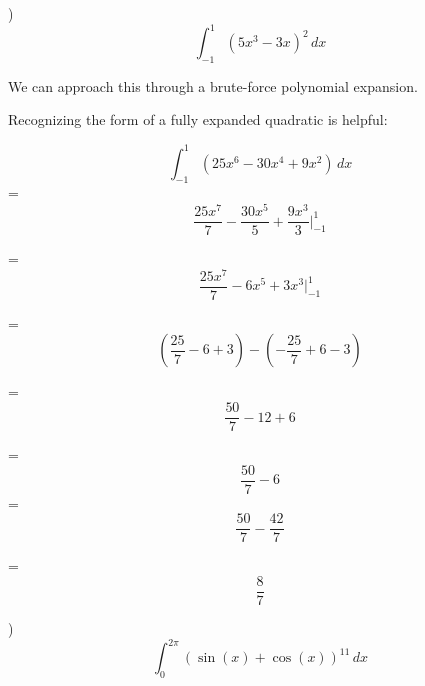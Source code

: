 \documentclass{article}
\begin{document}
)
\[\int_{-1}^{1} (5x^3-3x)^2 \,dx \]

\noindent We can approach this through a brute-force polynomial expansion. 

\noindent Recognizing the form of a fully expanded quadratic is helpful:
\begin{flushleft}
\[\int_{-1}^{1} (25x^6-30x^4+9x^2) \,dx \]
= \[\frac{25x^7}{7} - \frac{30x^5}{5} + \frac{9x^3}{3} \Big|_{-1}^{1}\]

= \[\frac{25x^7}{7} - 6x^5 + {3x^3} \Big|_{-1}^{1}\]

= \[ (\frac{25}{7}-6+3)-(-\frac{25}{7}+6-3)\]

= \[\frac{50}{7}-12+6\]

= \[\frac{50}{7} -6\]
= \[\frac{50}{7} - \frac{42}{7}\]

=\[\boxed{\frac{8}{7}}\]
\end{flushleft}


)
\[\int_{0}^{2\pi} (\sin\left(x\right)+\cos\left(x\right))^{11} \,dx \]
\end{document}
